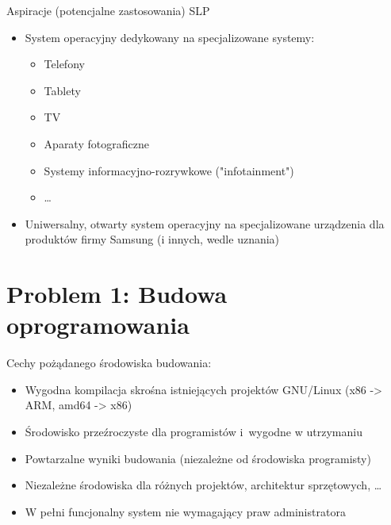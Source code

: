 \documentclass[presentation,aspectratio=43,12pt]{beamer}
\begin{document}
\begin{frame}[label=sec-4-5]{Aspiracje (potencjalne zastosowania) SLP}
\begin{itemize}
\item System operacyjny dedykowany na specjalizowane systemy:
\begin{itemize}
\item Telefony
\item Tablety
\item TV
\item Aparaty fotograficzne
\item Systemy informacyjno-rozrywkowe ("infotainment")
\item \ldots{}
\end{itemize}
\pause

\item Uniwersalny, otwarty system operacyjny na specjalizowane
urządzenia dla produktów firmy Samsung (i innych, wedle uznania)
\end{itemize}

\end{frame}

\section{Problem 1: Budowa oprogramowania}
\label{sec-5}

\begin{frame}[label=sec-5-1]{Cechy pożądanego środowiska budowania:}
\begin{itemize}
\item Wygodna kompilacja skrośna istniejących projektów GNU/Linux (x86
-> ARM, amd64 -> x86)

\item Środowisko przeźroczyste dla programistów i~wygodne w utrzymaniu

\item Powtarzalne wyniki budowania (niezależne od środowiska
programisty)
\end{itemize}


\begin{itemize}
\item <2-> Niezależne środowiska dla różnych projektów, architektur sprzętowych, \ldots{}

\item <2-> W pełni funcjonalny system nie wymagający praw administratora
\end{itemize}

\end{frame}
\end{document}
